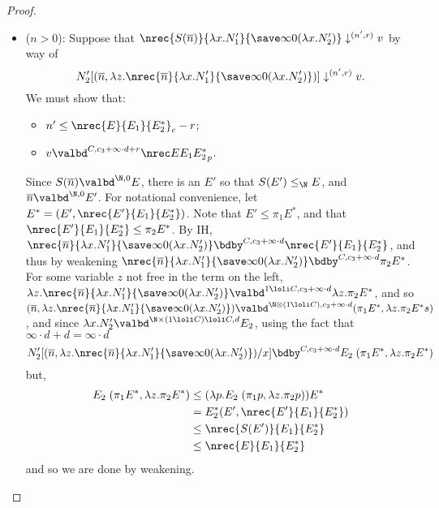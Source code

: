\begin{proof}
\begin{itemize}
  \item \sloppypar ($n > 0$): Suppose that $\nrec {S(\overline{n})} {\lambda x.N_1'} {\save \infty 0 {(\lambda x.N_2')}} \downarrow^{(n',r)} v$ by way of 
$$
  N_2'[(\overline{n},\lambda z.\nrec {\overline{n}} {\lambda x.N_1'} {\save \infty 0 {(\lambda x.N_2')}})] \downarrow^{(n',r)} v.
$$ 
We must show that:
  \begin{itemize}
    \item $n' \leq \nrec {E} {E_1} {E_2^*}_c - r$;
    \item $v \valbd^{C,c_3+\infty \cdot d + r} \nrec E {E_1} {E_2^*}_p$.
  \end{itemize}
  Since $S(\overline{n}) \valbd^{\N,0} E$, there is an $E'$ so that $S(E') \leq_\N E$, and $\overline{n} \valbd^{\N,0} E'$. For notational convenience, let $E^* = (E',\nrec {E'} {E_1} {E_2^*})$. Note that $E' \leq \pi_1 E^*$, and that $\nrec {E'} {E_1} {E_2^*} \leq \pi_2 E^*$. By IH, $\nrec {\overline{n}} {\lambda x.N_1'} {\save \infty 0 {(\lambda x.N_2')}} \bdby^{C,c_3 + \infty \cdot d} \nrec {E'} {E_1} {E_2^*}$, and thus by weakening $\nrec {\overline{n}} {\lambda x.N_1'} {\save \infty 0 {(\lambda x.N_2')}} \bdby^{C,c_3 + \infty \cdot d} \pi_2 E^*$. For some variable $z$ not free in the term on the left, $\lambda z. \nrec {\overline{n}} {\lambda x.N_1'} {\save \infty 0 {(\lambda x.N_2')}} \valbd^{1 \loli C,c_3 + \infty \cdot d} \lambda z. \pi_2 E^*$, and so $(\overline{n},\lambda z. \nrec {\overline{n}} {\lambda x.N_1'} {\save \infty 0 {(\lambda x.N_2')}}) \valbd^{\N \otimes (1 \loli C),c_3 + \infty \cdot d} (\pi_1 E^*,\lambda z. \pi_2 E^*s)$, and since $\lambda x.N_2' \valbd^{\N \times (1 \loli C) \loli C,d} E_2$, using the fact that $\infty \cdot d + d = \infty \cdot d$
  $$N_2'[(\overline{n},\lambda z. \nrec {\overline{n}} {\lambda x.N_1'} {\save \infty 0 {(\lambda x.N_2')}})/x] \bdby^{C,c_3 + \infty \cdot d} E_2 \; (\pi_1 E^*,\lambda z.\pi_2 E^*)$$
  but,
  \begin{align*}
   E_2 \; (\pi_1 E^*,\lambda z.\pi_2 E^*) &\leq (\lambda p. E_2 \; (\pi_1 p, \lambda z.\pi_2 p)) E^*\\
   &= E_2^* (E',\nrec {E'} {E_1} {E_2^*})\\
   &\leq \nrec {S(E')} {E_1} {E_2^*}\\
   &\leq \nrec {E} {E_1} {E_2^*}
  \end{align*}
  and so we are done by weakening.
\end{itemize}
\end{proof}
